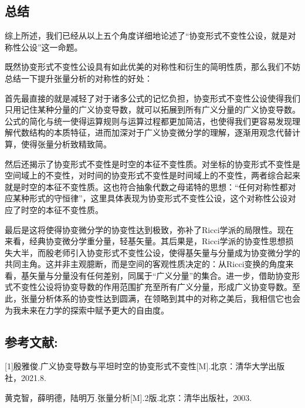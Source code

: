 \documentclass[UTF8]{ctexart}
\begin{document}
\subsection{总结}
综上所述，我们已经从以上五个角度详细地论述了“协变形式不变性公设，就是对称性公设”这一命题。\par
既然协变形式不变性公设具有如此优美的对称性和衍生的简明性质，那么我们不妨总结一下提升张量分析的对称性的好处：\par

首先最直接的就是减轻了对于诸多公式的记忆负担，协变形式不变性公设使得我们只用记住某种分量的广义协变导数，就可以拓展到所有广义分量的广义协变导数。公式的简化与统一使得运算规则与运算过程都更加简洁，也使得我们更容易发现理解代数结构的本质特征，进而加深对于广义协变微分学的理解，逐渐用观念代替计算，使得张量分析致精致简。\par
然后还揭示了协变形式不变性是时空的本征不变性质。对坐标的协变形式不变性是空间域上的不变性，对时间的协变形式不变性是时间域上的不变性，两者综合起来就是时空的本征不变性质。这也符合抽象代数之母诺特的思想：“任何对称性都对应某种形式的守恒律”，这里具体表现为协变形式不变性公设，这个对称性公设对应了时空的本征不变性质。\par
最后是这将使得协变微分学的协变性达到极致，弥补了Ricci学派的局限性。现在来看，经典协变微分学重分量，轻基矢量。其后果是，Ricci学派的协变性思想损失大半，而殷老师引入协变形式不变性公设，使得基矢量与分量成为协变微分学的共同主角。这并非主观臆断，而是空间的客观性质决定的：从Ricci变换的角度来看，基矢量与分量没有任何差别，同属于“广义分量”的集合。进一步，借助协变形式不变性公设将协变导数的作用范围扩充至所有广义分量，形成广义协变导数。至此，张量分析体系的协变性达到圆满，在领略到其中的对称之美后，我相信它也会为我未来在力学的探索中赋予更大的自由度。



\subsection*{参考文献:}
[1]殷雅俊.广义协变导数与平坦时空的协变形式不变性[M].北京：清华大学出版社，2021.8.\par
[2]黄克智，薛明德，陆明万.张量分析[M].2版.北京：清华出版社，2003.\par
\end{document}
